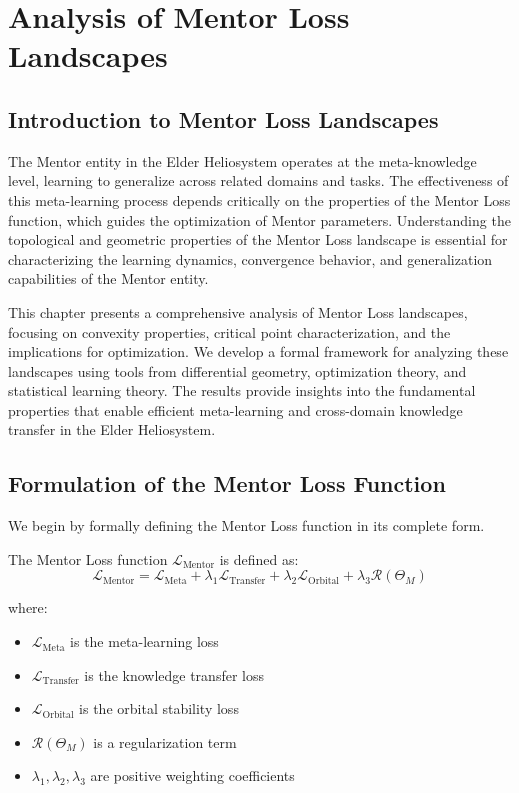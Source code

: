 \chapter{Analysis of Mentor Loss Landscapes}

\section{Introduction to Mentor Loss Landscapes}

The Mentor entity in the Elder Heliosystem operates at the meta-knowledge level, learning to generalize across related domains and tasks. The effectiveness of this meta-learning process depends critically on the properties of the Mentor Loss function, which guides the optimization of Mentor parameters. Understanding the topological and geometric properties of the Mentor Loss landscape is essential for characterizing the learning dynamics, convergence behavior, and generalization capabilities of the Mentor entity.

This chapter presents a comprehensive analysis of Mentor Loss landscapes, focusing on convexity properties, critical point characterization, and the implications for optimization. We develop a formal framework for analyzing these landscapes using tools from differential geometry, optimization theory, and statistical learning theory. The results provide insights into the fundamental properties that enable efficient meta-learning and cross-domain knowledge transfer in the Elder Heliosystem.

\section{Formulation of the Mentor Loss Function}

We begin by formally defining the Mentor Loss function in its complete form.

\begin{definition}
The Mentor Loss function $\mathcal{L}_{\text{Mentor}}$ is defined as:
\begin{equation}
\mathcal{L}_{\text{Mentor}} = \mathcal{L}_{\text{Meta}} + \lambda_1 \mathcal{L}_{\text{Transfer}} + \lambda_2 \mathcal{L}_{\text{Orbital}} + \lambda_3 \mathcal{R}(\Theta_M)
\end{equation}

where:
\begin{itemize}
    \item $\mathcal{L}_{\text{Meta}}$ is the meta-learning loss
    \item $\mathcal{L}_{\text{Transfer}}$ is the knowledge transfer loss
    \item $\mathcal{L}_{\text{Orbital}}$ is the orbital stability loss
    \item $\mathcal{R}(\Theta_M)$ is a regularization term
    \item $\lambda_1, \lambda_2, \lambda_3$ are positive weighting coefficients
\end{itemize}
\end{definition}

